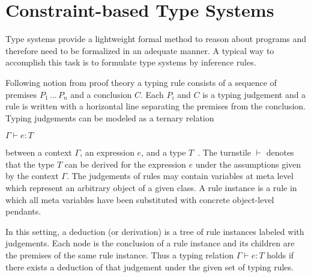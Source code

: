 \section{Constraint-based Type Systems}

Type systems provide a lightweight formal method to reason about
programs and therefore need to be formalized in an adequate manner. A
typical way to accomplish this task is to formulate type systems by
inference rules.

Following notion from proof theory a typing rule consists of a
sequence of premises $P_1\, ...\, P_n$ and a conclusion $C$. Each
$P_i$ and $C$ is a typing judgement and a rule is written with a
horizontal line separating the premises from the conclusion.  Typing
judgements can be modeled as a ternary relation
\begin{center}
  $\Gamma \vdash e : T$
\end{center}
between a context $\Gamma$, an expression $e$, and a type
$T$~\cite{DamasMilner82}. The turnstile $\vdash$ denotes that the type
$T$ can be derived for the expression $e$ under the assumptions given
by the context $\Gamma$.  The judgements of rules may contain
variables at meta level which represent an arbitrary object of a given
class. A rule instance is a rule in which all meta variables have been
substituted with concrete object-level pendants.

In this setting, a deduction (or derivation) is a tree of rule
instances labeled with judgements. Each node is the conclusion of a
rule instance and its children are the premises of the same rule
instance. Thus a typing relation $\Gamma \vdash e : T$ holds if there
exists a deduction of that judgement under the given set of typing
rules.

